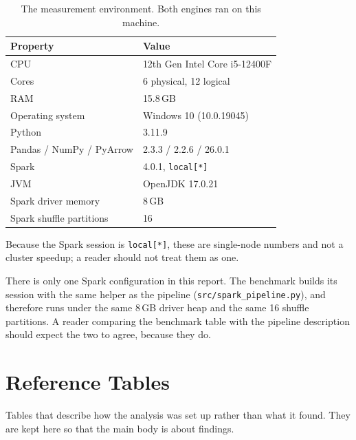 \documentclass[sigconf,balance=false]{acmart}
\begin{document}
\begin{table}[t]
\caption{The measurement environment. Both engines ran on this machine.}
\label{tab:env}
\centering
\footnotesize
\begin{tabular}{@{}ll@{}}
\toprule
Property & Value \\
\midrule
CPU & 12th Gen Intel Core i5-12400F \\
Cores & 6 physical, 12 logical \\
RAM & 15.8\,GB \\
Operating system & Windows 10 (10.0.19045) \\
Python & 3.11.9 \\
Pandas / NumPy / PyArrow & 2.3.3 / 2.2.6 / 26.0.1 \\
Spark & 4.0.1, \texttt{local[*]} \\
JVM & OpenJDK 17.0.21 \\
\midrule
Spark driver memory & 8\,GB \\
Spark shuffle partitions & 16 \\
\bottomrule
\end{tabular}
\end{table}

Because the Spark session is \texttt{local[*]}, these are single-node
numbers and not a cluster speedup; a reader should not treat them as one.

There is only one Spark configuration in this report. The benchmark builds
its session with the same helper as the pipeline
(\texttt{src/spark\_\allowbreak pipeline.py}), and therefore runs under the
same 8\,GB driver heap and the same 16 shuffle partitions. A reader
comparing the benchmark table with the pipeline description should expect
the two to agree, because they do.

\FloatBarrier

\section{Reference Tables}\label{app:derived}

Tables that describe how the analysis was set up rather than what it
found.  They are kept here so that the main body is about findings.
\end{document}
